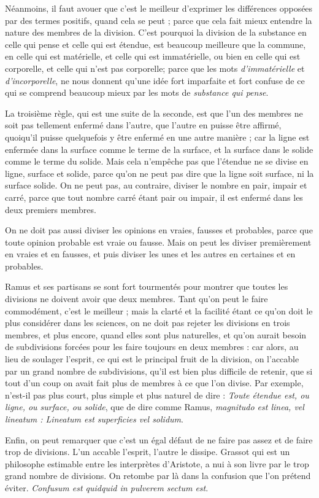 Néanmoins, il faut avouer que c'est le meilleur d'exprimer les différences opposées par des termes positifs, quand cela se peut ; parce que cela fait mieux entendre la nature des membres de la division. C'est pourquoi la division de la substance en celle qui pense et celle qui est étendue, est beaucoup meilleure que la commune, en celle qui est matérielle, et celle qui est immatérielle, ou bien en celle qui est corporelle, et celle qui n'est pas corporelle; parce que les mots \emph{d'immatérielle} et \emph{d'incorporelle}, ne nous donnent qu'une idée fort imparfaite et fort confuse de ce qui se comprend beaucoup mieux par les mots de \emph{substance qui pense}.

La troisième règle, qui est une suite de la seconde, est que l'un des membres ne soit pas tellement enfermé dans l'autre, que l'autre en puisse être affirmé, quoiqu'il puisse quelquefois y être enfermé en une autre manière ; car la ligne est enfermée dans la surface comme le terme de la surface, et la surface dans le solide comme le terme du solide. Mais cela n'empêche pas que l'étendue ne se divise en ligne, surface et solide, parce qu'on ne peut pas dire que la ligne soit surface, ni la surface solide. On ne peut pas, au contraire, diviser le nombre en pair, impair et carré, parce que tout nombre carré étant pair ou impair, il est enfermé dans les deux premiers membres.

On ne doit pas aussi diviser les opinions en vraies, fausses et probables, parce que toute opinion probable est vraie ou fausse. Mais on peut les diviser premièrement en vraies et en fausses, et puis diviser les unes et les autres en certaines et en probables.

Ramus et ses partisans se sont fort tourmentés pour montrer que toutes les divisions ne doivent avoir que deux membres. Tant qu'on peut le faire commodément, c'est le meilleur ; mais la clarté et la facilité étant ce qu'on doit le plus considérer dans les sciences, on ne doit pas rejeter les divisions en trois membres, et plus encore, quand elles sont plus naturelles, et qu'on aurait besoin de subdivisions forcées pour les faire toujours en deux membres : car alors, au lieu de soulager l'esprit, ce qui est le principal fruit de la division, on l'accable par un grand nombre de subdivisions, qu'il est bien plus difficile de retenir, que si tout d'un coup on avait fait plus de membres à ce que l'on divise. Par exemple, n'est-il pas plus court, plus simple et plus naturel de dire : \emph{Toute étendue est, ou ligne, ou surface, ou solide}, que de dire comme Ramus, \emph{magnitudo est linea, vel lineatum : Lineatum est superficies vel solidum}.

Enfin, on peut remarquer que c'est un égal défaut de ne faire pas assez et de faire trop de divisions. L'un accable l'esprit, l'autre le dissipe. Grassot qui est un philosophe estimable entre les interprètes d'Aristote, a nui à son livre par le trop grand nombre de divisions. On retombe par là dans la confusion que l'on prétend éviter. \emph{Confusum est quidquid in pulverem sectum est}.

